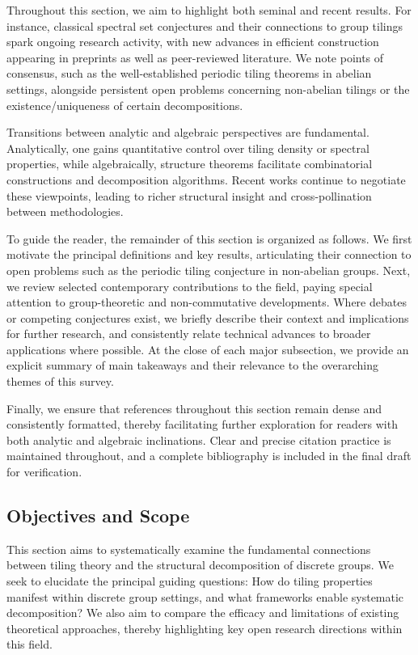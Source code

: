 \documentclass[sigconf]{acmart}
\begin{document}
Throughout this section, we aim to highlight both seminal and recent results. For instance, classical spectral set conjectures and their connections to group tilings spark ongoing research activity, with new advances in efficient construction appearing in preprints as well as peer-reviewed literature. We note points of consensus, such as the well-established periodic tiling theorems in abelian settings, alongside persistent open problems concerning non-abelian tilings or the existence/uniqueness of certain decompositions.

Transitions between analytic and algebraic perspectives are fundamental. Analytically, one gains quantitative control over tiling density or spectral properties, while algebraically, structure theorems facilitate combinatorial constructions and decomposition algorithms. Recent works continue to negotiate these viewpoints, leading to richer structural insight and cross-pollination between methodologies.

To guide the reader, the remainder of this section is organized as follows. We first motivate the principal definitions and key results, articulating their connection to open problems such as the periodic tiling conjecture in non-abelian groups. Next, we review selected contemporary contributions to the field, paying special attention to group-theoretic and non-commutative developments. Where debates or competing conjectures exist, we briefly describe their context and implications for further research, and consistently relate technical advances to broader applications where possible. At the close of each major subsection, we provide an explicit summary of main takeaways and their relevance to the overarching themes of this survey.

Finally, we ensure that references throughout this section remain dense and consistently formatted, thereby facilitating further exploration for readers with both analytic and algebraic inclinations. Clear and precise citation practice is maintained throughout, and a complete bibliography is included in the final draft for verification.

\subsection*{Objectives and Scope}

This section aims to systematically examine the fundamental connections between tiling theory and the structural decomposition of discrete groups. We seek to elucidate the principal guiding questions: How do tiling properties manifest within discrete group settings, and what frameworks enable systematic decomposition? We also aim to compare the efficacy and limitations of existing theoretical approaches, thereby highlighting key open research directions within this field.
\end{document}
